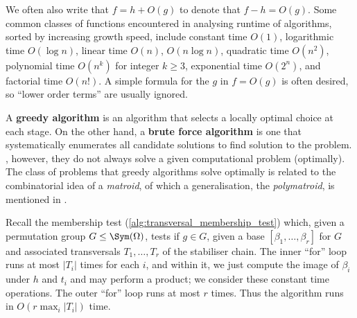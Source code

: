 We often also write that $f = h + O(g)$ to denote that $f - h = O(g)$. Some common classes of functions encountered in analysing runtime of algorithms, sorted by increasing growth speed, include constant time $O(1)$, logarithmic time $O(\log n)$, linear time $O(n)$,  $O(n\log n)$, quadratic time $O(n^2)$, polynomial time $O(n^k)$ for integer $k \geq 3$, exponential time $O(2^n)$, and factorial time $O(n!)$. A simple formula for the $g$ in $f = O(g)$ is often desired, so ``lower order terms'' are usually ignored. 


A \textbf{greedy algorithm} is an algorithm that selects a locally optimal choice at each stage. On the other hand, a \textbf{brute force algorithm} is one that systematically enumerates all candidate solutions to find  solution to the problem. , however, they do not always solve a given computational problem (optimally). The class of problems that greedy algorithms solve optimally is related to the combinatorial idea of a \textit{matroid}, of which a generalisation, the \textit{polymatroid}, is mentioned in \cite{blaha1992}.

\begin{example}\label{eg:alg:transversal_membership_test:complexity}
    Recall the membership test (\autoref{alg:transversal_membership_test}) which, given a permutation group $G \leq \Sym(\Omega)$, tests if $g \in G$, given a base $[\beta_1,\dotsc,\beta_r]$ for $G$ and associated transversals $T_1,\dotsc,T_r$ of the stabiliser chain. The inner ``for'' loop runs at most $|T_i|$ times for each $i$, and within it, we just compute the image of $\beta_i$ under $h$ and $t_i$ and may perform a product; we consider these constant time operations. The outer ``for'' loop runs at most $r$ times. Thus the algorithm runs in $O(r\max_i |T_i|)$ time.
\end{example}

